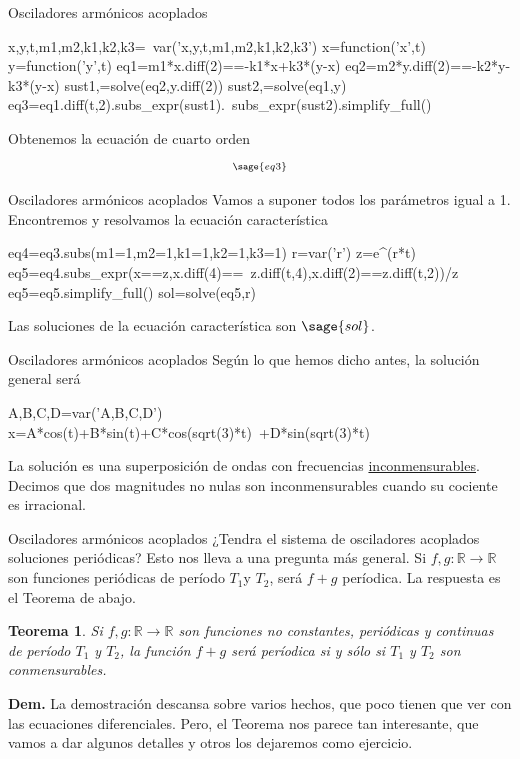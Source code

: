 \documentclass[hyperref={colorlinks=true}]{beamer}
\newtheorem{thm}{Teorema}
\newcommand{\rr}{\mathbb{R}}
\begin{document}
\begin{frame}[fragile]{Osciladores armónicos acoplados}
\begin{sageblock}
  x,y,t,m1,m2,k1,k2,k3=\
  var('x,y,t,m1,m2,k1,k2,k3')
  x=function('x',t)
  y=function('y',t)
  eq1=m1*x.diff(2)==-k1*x+k3*(y-x)
  eq2=m2*y.diff(2)==-k2*y-k3*(y-x)
  sust1,=solve(eq2,y.diff(2))
  sust2,=solve(eq1,y)
  eq3=eq1.diff(t,2).subs_expr(sust1).\
  subs_expr(sust2).simplify_full()
\end{sageblock}
Obtenemos la ecuación de cuarto orden
\[{\scriptstyle \sage{eq3}}\]
\end{frame}


\begin{frame}[fragile]{Osciladores armónicos acoplados}
 Vamos a suponer todos los parámetros igual a 1. Encontremos y resolvamos la ecuación característica
\begin{sageblock}
  eq4=eq3.subs(m1=1,m2=1,k1=1,k2=1,k3=1)
  r=var('r')
  z=e^(r*t)
  eq5=eq4.subs_expr(x==z,x.diff(4)==\
  z.diff(t,4),x.diff(2)==z.diff(t,2))/z
  eq5=eq5.simplify_full()
  sol=solve(eq5,r)
\end{sageblock}
Las soluciones de la ecuación característica son $\sage{sol}$.
\end{frame}



\begin{frame}[fragile]{Osciladores armónicos acoplados}
Según lo que hemos dicho antes, la solución general será
\begin{sageblock}
  A,B,C,D=var('A,B,C,D')
  x=A*cos(t)+B*sin(t)+C*cos(sqrt(3)*t)\
  +D*sin(sqrt(3)*t)
\end{sageblock}
La solución es una superposición de ondas con frecuencias \href{http://es.wikipedia.org/wiki/Conmensurabilidad_(matemática)}{inconmensurables}. Decimos que dos magnitudes no nulas son inconmensurables cuando su cociente es irracional. 



\end{frame}


\begin{frame}{Osciladores armónicos acoplados}
¿Tendra el sistema de osciladores acoplados soluciones periódicas?  Esto nos lleva a una pregunta más general. Si $f,g:\rr\to\rr$ son funciones periódicas de período $T_1$y $T_2$, será $f+g$ períodica. La respuesta es el Teorema de abajo. 
  
\begin{thm}  Si $f,g:\rr\to\rr$ son funciones no constantes, periódicas y continuas de período $T_1$ y $T_2$, la función $f+g$ será períodica si y sólo si $T_1$ y $T_2$ son conmensurables.
\end{thm}

\textbf{Dem.} La demostración descansa sobre varios hechos, que poco tienen que ver con las ecuaciones diferenciales. Pero, el Teorema nos parece tan interesante, que vamos a dar algunos detalles y otros los dejaremos como ejercicio.



\end{frame}
\end{document}
